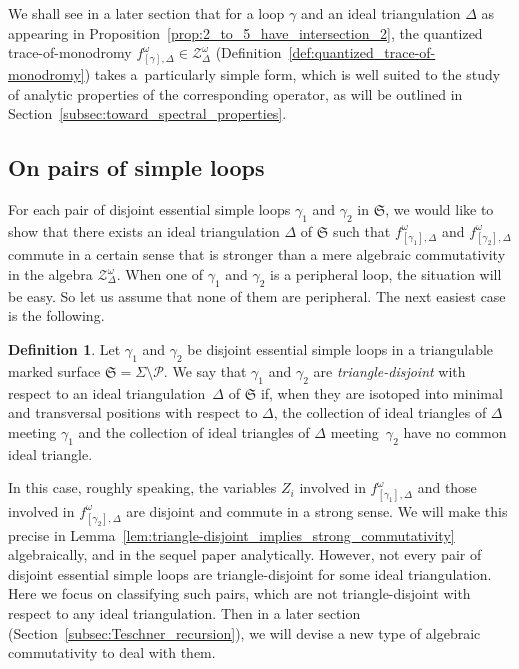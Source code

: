 \documentclass[10pt,a4paper]{amsart}
\numberwithin{equation}{section}
\theoremstyle{definition}
\newtheorem{Definition}[Theorem]{Definition}
\begin{document}
We shall see in a later section that for a loop $\gamma$ and an ideal triangulation $\Delta$ as appearing in Proposition~\ref{prop:2_to_5_have_intersection_2}, the quantized trace-of-monodromy $f^\omega_{[\gamma],\Delta}\in \mathcal{Z}^\omega_\Delta$ (Definition~\ref{def:quantized_trace-of-monodromy}) takes a~particularly simple form, which is well suited to the study of analytic properties of the corresponding operator, as will be outlined in Section~\ref{subsec:toward_spectral_properties}.
\subsection{On pairs of simple loops}
\label{subsec:pais_of_simple_loops}
For each pair of disjoint essential simple loops $\gamma_1$ and $\gamma_2$ in $\mathfrak{S}$, we would like to show that there exists an ideal triangulation $\Delta$ of $\mathfrak{S}$ such that $f^\omega_{[\gamma_1],\Delta}$ and $f^\omega_{[\gamma_2],\Delta}$ commute in a certain sense that is stronger than a mere algebraic commutativity in the algebra $\mathcal{Z}^\omega_\Delta$.
When one of $\gamma_1$ and $\gamma_2$ is a peripheral loop, the situation will be easy. So let us assume that none of them are peripheral. The next easiest case is the following.
\begin{Definition}
\label{def:triangle-disjoint}
Let $\gamma_1$ and $\gamma_2$ be disjoint essential simple loops in a triangulable marked surface $\mathfrak{S} = \Sigma \setminus \mathcal{P}$. We say that $\gamma_1$ and $\gamma_2$ are {\em triangle-disjoint} with respect to an ideal triangulation~$\Delta$ of $\mathfrak{S}$ if, when they are isotoped into minimal and transversal positions with respect to $\Delta$, the collection of ideal triangles of $\Delta$ meeting $\gamma_1$ and the collection of ideal triangles of $\Delta$ meeting~$\gamma_2$ have no common ideal triangle.
\end{Definition}
In this case, roughly speaking, the variables $Z_i$ involved in $f^\omega_{[\gamma_1],\Delta}$ and those involved in $f^\omega_{[\gamma_2],\Delta}$ are disjoint and commute in a strong sense. We will make this precise in Lemma~\ref{lem:triangle-disjoint_implies_strong_commutativity} algebraically, and in the sequel paper \cite{sequel} analytically.
However, not every pair of disjoint essential simple loops are triangle-disjoint for some ideal triangulation. Here we focus on classifying such pairs, which are not triangle-disjoint with respect to any ideal triangulation. Then in a later section (Section~\ref{subsec:Teschner_recursion}), we will devise a new type of algebraic commutativity to deal with them.
\end{document}
